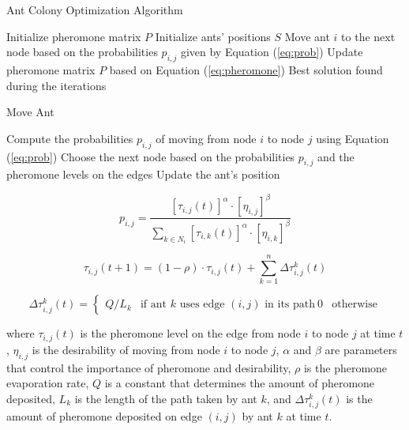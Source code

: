 \documentclass{article}
\begin{document}
\begin{algorithm}
\caption{Ant Colony Optimization Algorithm}\label{alg:aco}
\begin{algorithmic}[1]
\STATE Initialize pheromone matrix $P$
\STATE Initialize ants' positions $S$
\STATE Move ant $i$ to the next node based on the probabilities $p_{i,j}$ given by Equation (\ref{eq:prob})
\ENDFOR
\STATE Update pheromone matrix $P$ based on Equation (\ref{eq:pheromone})
\ENDWHILE
\RETURN Best solution found during the iterations
\end{algorithmic}
\end{algorithm}

\begin{algorithm}
\caption{Move Ant}\label{alg:move}
\begin{algorithmic}[1]
\STATE Compute the probabilities $p_{i,j}$ of moving from node $i$ to node $j$ using Equation (\ref{eq:prob})
\STATE Choose the next node based on the probabilities $p_{i,j}$ and the pheromone levels on the edges
\STATE Update the ant's position
\end{algorithmic}
\end{algorithm}

\begin{equation}
p_{i,j} = \frac{[\tau_{i,j}(t)]^\alpha \cdot [\eta_{i,j}]^\beta}{\sum\limits_{k \in N_i}[\tau_{i,k}(t)]^\alpha \cdot [\eta_{i,k}]^\beta}\label{eq:prob}
\end{equation}

\begin{equation}
\tau_{i,j}(t+1) = (1 - \rho) \cdot \tau_{i,j}(t) + \sum\limits_{k=1}^n \Delta\tau_{i,j}^k(t)\label{eq:pheromone}
\end{equation}

\begin{equation}
\Delta\tau_{i,j}^k(t) = \begin{cases}
Q/L_k & \text{if ant $k$ uses edge $(i,j)$ in its path}\
0 & \text{otherwise}
\end{cases}
\end{equation}

where $\tau_{i,j}(t)$ is the pheromone level on the edge from node $i$ to node $j$ at time $t$, $\eta_{i,j}$ is the desirability of moving from node $i$ to node $j$, $\alpha$ and $\beta$ are parameters that control the importance of pheromone and desirability, $\rho$ is the pheromone evaporation rate, $Q$ is a constant that determines the amount of pheromone deposited, $L_k$ is the length of the path taken by ant $k$, and $\Delta\tau_{i,j}^k(t)$ is the amount of pheromone deposited on edge $(i,j)$ by ant $k$ at time $t$.
\end{document}

